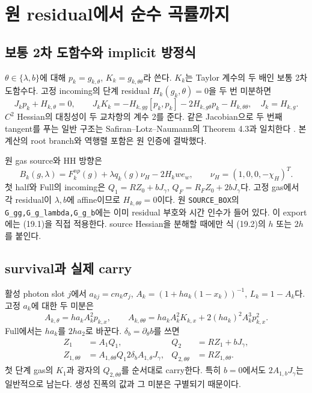 \section{원 residual에서 순수 곡률까지}
\subsection{보통 2차 도함수와 implicit 방정식}
$\theta\in\{\lambda,b\}$에 대해
$p_k=g_{k,\theta}$, $K_k=g_{k,\theta\theta}$라 쓴다.
$K_k$는 Taylor 계수의 두 배인 보통 2차 도함수다.
고정 incoming의 단계 residual $H_k(g_k,\theta)=0$을 두 번 미분하면
\[
J_kp_k+H_{k,\theta}=0,\qquad
\boxed{J_kK_k=-H_{k,gg}[p_k,p_k]-2H_{k,g\theta}p_k-H_{k,\theta\theta}},
\quad J_k=H_{k,g}.
\tag{19.1}
\]
$C^2$ Hessian의 대칭성이 두 교차항의 계수 2를 준다.
같은 Jacobian으로 두 번째 tangent를 푸는 일반 구조는
Safiran--Lotz--Naumann의 Theorem 4.3과 일치한다 \cite{SLN15}.
본 계산의 root branch와 역행렬 포함은 원 인증에 결박했다.

원 gas source와 HH 방향은
\[
B_k(g,\lambda)=F_k^{np}(g)+\lambda q_k(g)\nu_H-2H_kw e_w,
\qquad \nu_H=(1,0,0,-\chi_H)^T.
\tag{19.2}
\]
첫 half와 Full의 incoming은
$Q_1=RZ_0+bJ_\gamma$, $Q_F=R_FZ_0+2bJ_\gamma$다.
고정 gas에서 각 residual이 $\lambda,b$에 affine이므로
$H_{k,\theta\theta}=0$이다.
원 \texttt{SOURCE\_BOX}의 \texttt{G\_gg,G\_g\_lambda,G\_g\_b}에는
이미 residual 부호와 시간 인수가 들어 있다. 이 export에는 (19.1)을 직접 적용한다.
source Hessian을 분해할 때에만 식 (19.2)의 $h$ 또는 $2h$를 붙인다.

\subsection{survival과 실제 carry}
활성 photon slot $j$에서 $a_{kj}=cn_k\sigma_j$,
$A_k=(1+ha_k(1-x_k))^{-1}$, $L_k=1-A_k$다.
고정 $a_k$에 대한 두 미분은
\[
A_{k,\theta}=ha_kA_k^2p_{k,x},\qquad
\boxed{A_{k,\theta\theta}
=ha_kA_k^2K_{k,x}+2(ha_k)^2A_k^3p_{k,x}^2}.
\tag{19.3}
\]
Full에서는 $ha_k$를 $2ha_2$로 바꾼다.
$\delta_b=\partial_\theta b$를 쓰면
\[
\begin{aligned}
Z_1&=A_1Q_1,& Q_2&=RZ_1+bJ_\gamma,\\
Z_{1,\theta\theta}&=A_{1,\theta\theta}Q_1
2\delta_b A_{1,\theta}J_\gamma,&
Q_{2,\theta\theta}&=RZ_{1,\theta\theta}.
\end{aligned}
\tag{19.4}
\]
첫 단계 gas의 $K_1$과 광자의 $Q_{2,\theta\theta}$를 순서대로 carry한다.
특히 $b=0$에서도 $2A_{1,b}J_\gamma$는 일반적으로 남는다.
생성 진폭의 값과 그 미분은 구별되기 때문이다.

